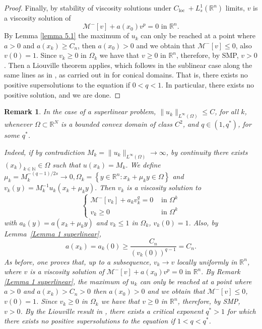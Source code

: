 \documentclass[11pt]{article}
\newtheorem{rem}{Remark}
\begin{document}
\begin{proof}
Finally, by stability of viscosity solutions under $C_{\text {loc }}+L_{s}^1\left(\mathbb{R}^n\right)$ limits, $v$ is a viscosity solution of
$$
\mathcal{M}^{-}[v] + a(x_0)v^p=0 \text { in } \mathbb{R}^n.
$$
By Lemma \ref{lemma 5.1} the maximum of $u_k$ can only be reached at a point where $a>0$ and $a(x_k)\geq C_n$, then $a(x_0)> 0$ and we obtain that $\mathcal{M}^{-}[v]\leq 0$, also $v(0)=1$. Since $v_k\geq 0$ in $\Omega_k$ we have that $v\geq 0$ in $\mathbb{R}^n$, therefore, by SMP, $v>0$. Then a Liouville theorem applies, which follows in the sublinear case along the same lines as in \cite {FQ2011}, as carried out in \cite{NPQ2024} for conical domains. That is, there exists no positive supersolutions to the equation if $0<q<1$. In particular, there exists no positive solution, and we are done.
\end{proof}

\begin{rem}\label{blow-up} In the case of a superlinear problem,  \(\| u_{k}\|_{L^\infty(\Omega)} \leq C\), for all \(k\), whenever $\Omega \subset \mathbb{R}^N$ is a bounded convex domain of class $C^2$, and $q \in\left(1, q^*\right)$, for some $q^*$.

Indeed, if by contradiction $M_k=\|u_k\|_{L^\infty(\Omega)}\rightarrow \infty$, by continuity there exists $\left(x_k\right)_{k \in \mathbb{N}} \in \Omega$ such that $u\left(x_k\right)=M_k$. We define $\mu_k=M_k^{-(q-1) / 2 s} \rightarrow 0, \Omega_k=\left\{y \in \mathbb{R}^n: x_k+\mu_k y \in \Omega\right\}$ and
$
v_k(y)=M_k^{-1} u_k\left(x_k+\mu_k y\right).
$
Then $v_k$ is a viscosity solution to
$$
\begin{cases}\mathcal{M}^{-} [v_k] + a_{k}v_{k}^q=0 & \text { in } \Omega^k \\ v_k\geq 0 & \text { in } \Omega^k\end{cases}
$$
with $a_k(y)=a(x_k+\mu_k y)$ and $v_k \leq 1$ in $\Omega_k$, $ v_k(0)=1$. Also, by Lemma~\ref{Lemma 1 superlinear},
$$
a(x_k)=a_k(0)\geq \frac{C_n}{(v_k(0))^{q-1}}=C_n.
$$ 
As before, one proves that, up to a subsequence, $v_k \rightarrow v$ locally uniformly in $\mathbb{R}^n$, where
 $v$ is a viscosity solution of
$
\mathcal{M}^{-}[v] + a(x_0)v^p=0 \text { in } \mathbb{R}^n.
$
By Remark \ref{Lemma 1 superlinear}, the maximum of $u_k$ can only be reached at a point where $a>0$ and $a(x_k)>C_n>0$ then $a(x_0)> 0$ and we obtain that $\mathcal{M}^{-} [v]\leq 0$, $v(0)=1$. Since $v_k\geq 0$ in $\Omega_k$ we have that $v\geq 0$ in $\mathbb{R}^n$, therefore, by SMP, $v>0$. By the Liouville result in \cite{FQ2011}, there exists a critical exponent $q^*>1$ for which there exists no positive supersolutions to the equation if $1<q<q^*$.
\end{rem}
\end{document}
